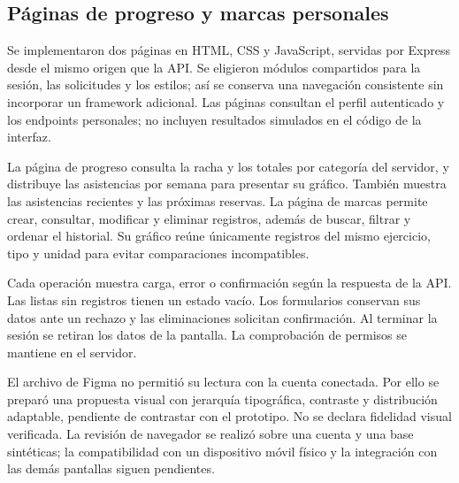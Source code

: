 \subsection{Páginas de progreso y marcas personales}
Se implementaron dos páginas en HTML, CSS y JavaScript, servidas por Express desde el mismo origen que la API. Se eligieron módulos compartidos para la sesión, las solicitudes y los estilos; así se conserva una navegación consistente sin incorporar un framework adicional. Las páginas consultan el perfil autenticado y los endpoints personales; no incluyen resultados simulados en el código de la interfaz.

La página de progreso consulta la racha y los totales por categoría del servidor, y distribuye las asistencias por semana para presentar su gráfico. También muestra las asistencias recientes y las próximas reservas. La página de marcas permite crear, consultar, modificar y eliminar registros, además de buscar, filtrar y ordenar el historial. Su gráfico reúne únicamente registros del mismo ejercicio, tipo y unidad para evitar comparaciones incompatibles.

Cada operación muestra carga, error o confirmación según la respuesta de la API. Las listas sin registros tienen un estado vacío. Los formularios conservan sus datos ante un rechazo y las eliminaciones solicitan confirmación. Al terminar la sesión se retiran los datos de la pantalla. La comprobación de permisos se mantiene en el servidor.

El archivo de Figma no permitió su lectura con la cuenta conectada. Por ello se preparó una propuesta visual con jerarquía tipográfica, contraste y distribución adaptable, pendiente de contrastar con el prototipo. No se declara fidelidad visual verificada. La revisión de navegador se realizó sobre una cuenta y una base sintéticas; la compatibilidad con un dispositivo móvil físico y la integración con las demás pantallas siguen pendientes.
